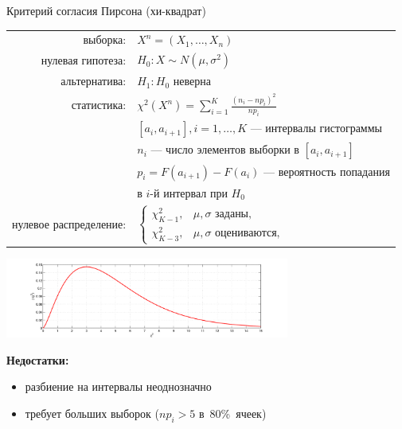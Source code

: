 \documentclass[9pt,pdf,utf8,hyperref={unicode},aspectratio=169]{beamer}
\begin{document}
\begin{frame}{Критерий согласия Пирсона (хи-квадрат)}   
	\small{
		\begin{center}
			\begin{tabular}{rl}
				выборка:                        & $X^n=\left(X_1,\ldots,X_n\right)$         \\
				нулевая гипотеза:               & $H_0\colon X \sim N\left(\mu,\sigma^2\right)$ \\
				альтернатива:                   & $H_1\colon H_0$ неверна\\
				статистика:                     & $\chi^2\left(X^n\right) = \sum\limits_{i=1}^K \frac{\left(n_i - np_i\right)^2}{np_i}$ \\
				& $[a_i,a_{i+1}], i=1,\dots,K$ --- интервалы гистограммы \\                                            
				& $n_i$ --- число элементов выборки в $[a_i,a_{i+1}]$ \\                                
				& $p_i = F\left(a_{i+1}\right) - F\left(a_i\right)$ --- вероятность попадания \\
				& в $i$-й интервал при $H_0$\\
				нулевое распределение:          & $\begin{cases}
				\chi^2_{K-1}, & \mu, \sigma \text{ заданы,} \\
				\chi^2_{K-3}, & \mu, \sigma \text{ оцениваются},
				\end{cases}$\\
			\end{tabular}
			\includegraphics[width=0.7\textwidth]{chi2.png}        
		\end{center}
		
		\vspace{-5pt}
		
		\textbf{Недостатки:}
		\begin{itemize}
			\item разбиение на интервалы неоднозначно
			\item требует больших выборок ($np_i>5$ в~80\%~ячеек)
		\end{itemize}
	}
\end{frame}
\end{document}
